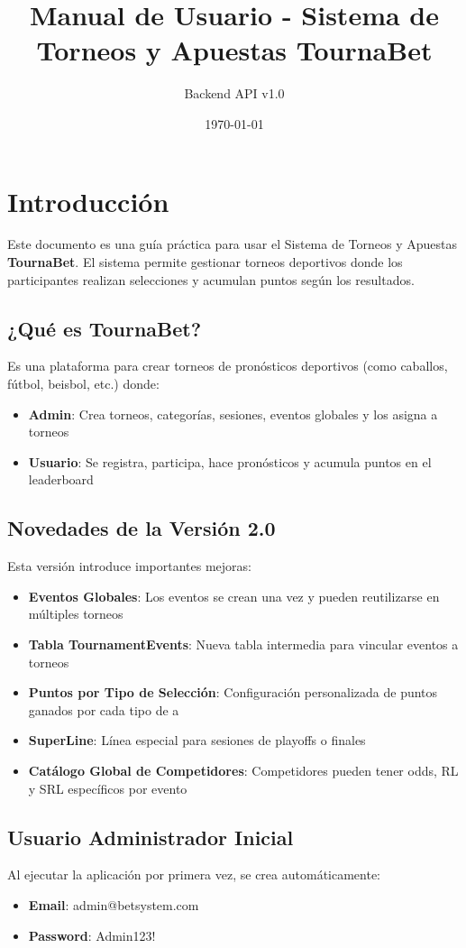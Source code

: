 \documentclass[12pt,a4paper]{article}
\title{Manual de Usuario - Sistema de Torneos y Apuestas TournaBet}
\author{Backend API v1.0}
\date{\today}
\begin{document}
\maketitle
\tableofcontents
\newpage

\section{Introducción}
Este documento es una guía práctica para usar el Sistema de Torneos y Apuestas \textbf{TournaBet}.
El sistema permite gestionar torneos deportivos donde los participantes realizan selecciones
y acumulan puntos según los resultados.

\subsection{¿Qué es TournaBet?}
Es una plataforma para crear torneos de pronósticos deportivos (como caballos, fútbol, beisbol, etc.)
donde:
\begin{itemize}
    \item \textbf{Admin}: Crea torneos, categorías, sesiones, eventos globales y los asigna a torneos
    \item \textbf{Usuario}: Se registra, participa, hace pronósticos y acumula puntos en el leaderboard
\end{itemize}

\subsection{Novedades de la Versión 2.0}
Esta versión introduce importantes mejoras:
\begin{itemize}
    \item \textbf{Eventos Globales}: Los eventos se crean una vez y pueden reutilizarse en múltiples torneos
    \item \textbf{Tabla TournamentEvents}: Nueva tabla intermedia para vincular eventos a torneos
    \item \textbf{Puntos por Tipo de Selección}: Configuración personalizada de puntos ganados por cada tipo de a
\item \textbf{SuperLine}: Línea especial para sesiones de playoffs o finales
    \item \textbf{Catálogo Global de Competidores}: Competidores pueden tener odds, RL y SRL específicos por evento
\end{itemize}

\subsection{Usuario Administrador Inicial}
Al ejecutar la aplicación por primera vez, se crea automáticamente:
\begin{itemize}
    \item \textbf{Email}: admin@betsystem.com
    \item \textbf{Password}: Admin123!
\end{itemize}
\end{document}
